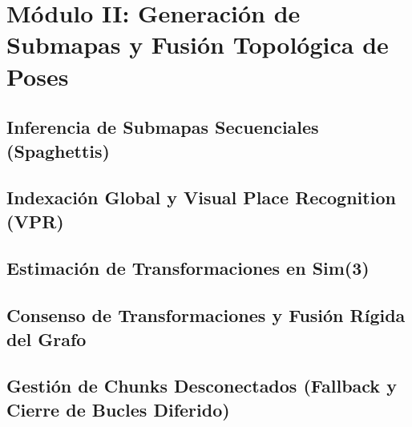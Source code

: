 \chapter{Módulo II: Generación de Submapas y Fusión Topológica de Poses}

\section{Inferencia de Submapas Secuenciales (Spaghettis)}

\section{Indexación Global y Visual Place Recognition (VPR)}

\section{Estimación de Transformaciones en Sim(3)}

\section{Consenso de Transformaciones y Fusión Rígida del Grafo}

\section{Gestión de Chunks Desconectados (Fallback y Cierre de Bucles Diferido)}
